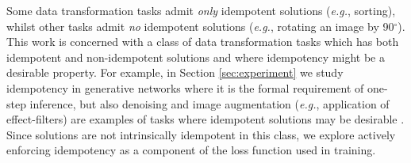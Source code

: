 \documentclass{article}
\theoremstyle{plain}
\theoremstyle{definition}
\theoremstyle{remark}
\begin{document}
Some data transformation tasks admit \textit{only} idempotent solutions (\textit{e.g.}, sorting), whilst other tasks admit \textit{no} idempotent solutions (\textit{e.g.}, rotating an image by 90$^{\circ}$). This work is concerned with a class of data transformation tasks which has both idempotent and non-idempotent solutions and where idempotency might be a desirable property. For example, in Section \ref{sec:experiment} we study idempotency in generative networks where it is the formal requirement of one-step inference, but also denoising and image augmentation (\textit{e.g.}, application of effect-filters) are examples of tasks where idempotent solutions may be desirable \cite{mao-deblurring,liu-gans}. Since solutions are not intrinsically idempotent in this class, we explore actively enforcing idempotency as a component of the loss function used in training.

\end{document}
